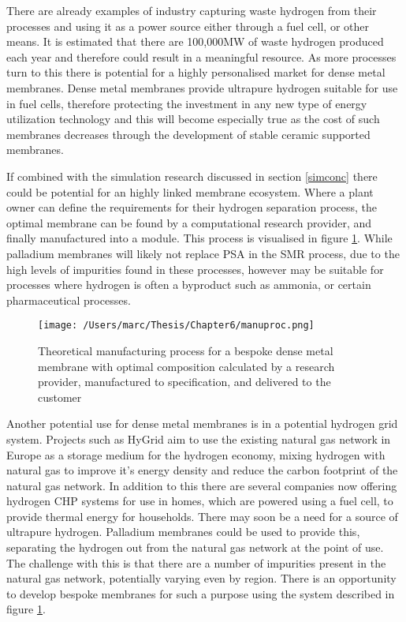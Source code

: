 There are already examples of industry capturing waste hydrogen from their processes and using it as a power source either through a fuel cell, or other means.\cite{doi:10.1177/0144598719839767} It is estimated that there are 100,000MW of waste hydrogen produced each year and therefore could result in a meaningful resource. \cite{cox} As more processes turn to this there is potential for a highly personalised market for dense metal membranes. Dense metal membranes provide ultrapure hydrogen suitable for use in fuel cells, therefore protecting the investment in any new type of energy utilization technology and this will become especially true as the cost of such membranes decreases through the development of stable ceramic supported membranes.

If combined with the simulation research discussed in section \ref{simconc} there could be potential for an highly linked membrane ecosystem. Where a plant owner can define the requirements for their hydrogen separation process, the optimal membrane can be found by a computational research provider, and finally manufactured into a module. This process is visualised in figure \ref{manuproc}. While palladium membranes will likely not replace PSA in the SMR process, due to the high levels of impurities found in these processes, however may be suitable for processes where hydrogen is often a byproduct such as ammonia, or certain pharmaceutical processes. 

\begin{figure}
    \centering
    \texttt{[image: /Users/marc/Thesis/Chapter6/manuproc.png]}
    \caption{Theoretical manufacturing process for a bespoke dense metal membrane with optimal composition calculated by a research provider, manufactured to specification, and delivered to the customer}
    \label{manuproc}
\end{figure}

Another potential use for dense metal membranes is in a potential hydrogen grid system. Projects such as HyGrid \cite{hygrid} aim to use the existing natural gas network in Europe as a storage medium for the hydrogen economy, mixing hydrogen with natural gas to improve it's energy density and reduce the carbon footprint of the natural gas network. In addition to this there are several companies now offering hydrogen CHP systems for use in homes, which are powered using a fuel cell, to provide thermal energy for households.\cite{giacomini} There may soon be a need for a source of ultrapure hydrogen. Palladium membranes could be used to provide this, separating the hydrogen out from the natural gas network at the point of use. The challenge with this is that there are a number of impurities present in the natural gas network, potentially varying even by region. There is an opportunity to develop bespoke membranes for such a purpose using the system described in figure \ref{manuproc}.

